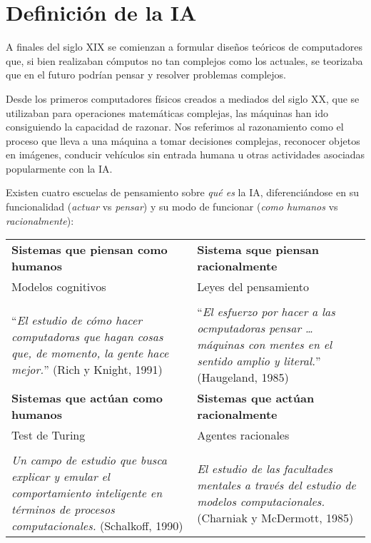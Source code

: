 \section{Definición de la IA}

A finales del siglo XIX se comienzan a formular diseños teóricos de computadores que, si bien realizaban cómputos no tan complejos como los actuales, se teorizaba que en el futuro podrían pensar y resolver problemas complejos.

Desde los primeros computadores físicos creados a mediados del siglo XX, que se utilizaban para operaciones matemáticas complejas, las máquinas han ido consiguiendo la capacidad de razonar.
Nos referimos al razonamiento como el proceso que lleva a una máquina a tomar decisiones complejas, reconocer objetos en imágenes, conducir vehículos sin entrada humana u otras actividades asociadas popularmente con la IA\@.

Existen cuatro escuelas de pensamiento sobre \textit{qué es} la IA, diferenciándose en su funcionalidad (\textit{actuar} vs \textit{pensar}) y su modo de funcionar (\textit{como humanos} vs \textit{racionalmente}):

\begin{center}
\begin{tabular}{C{6.5cm} | C{6.5cm}}
\textbf{Sistemas que piensan como humanos} & \textbf{Sistema sque piensan racionalmente} \\
Modelos cognitivos                         & Leyes del pensamiento                       \\
                                           &                                             \\
``\textit{El estudio de cómo hacer computadoras que hagan cosas que, de momento, la gente hace mejor.}'' (Rich y Knight, 1991) &
``\textit{El esfuerzo por hacer a las ocmputadoras pensar \ldots máquinas con mentes en el sentido amplio y literal.}'' (Haugeland, 1985) \\
\midrule
\textbf{Sistemas que actúan como humanos} & \textbf{Sistemas que actúan racionalmente} \\
Test de Turing                            & Agentes racionales                         \\
                                          &                                            \\
\textit{Un campo de estudio que busca explicar y emular el comportamiento inteligente en términos de procesos computacionales.} (Schalkoff, 1990) &
\textit{El estudio de las facultades mentales a través del estudio de modelos computacionales.} (Charniak y McDermott, 1985) \\
\end{tabular}
\end{center}

